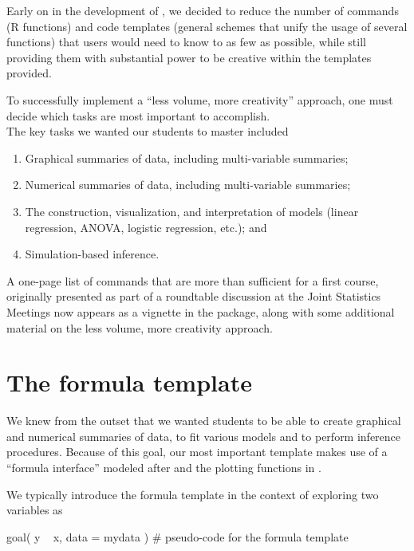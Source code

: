 Early on in the development of , we decided to reduce the
number of commands (R functions) and code templates (general schemes
that unify the usage of several functions) that users would need to know
to as few as possible, while still providing them with substantial power
to be creative within the templates provided.

To successfully implement a ``less volume, more creativity'' approach,
one must decide which tasks are most important to accomplish.\\
The key tasks we wanted our students to master included

\begin{enumerate}
\def\labelenumi{\arabic{enumi}.}
\tightlist
\item
  Graphical summaries of data, including multi-variable summaries;
\item
  Numerical summaries of data, including multi-variable summaries;
\item
  The construction, visualization, and interpretation of models (linear
  regression, ANOVA, logistic regression, etc.); and
\item
  Simulation-based inference.
\end{enumerate}

A one-page list of commands that are more than sufficient for a first
course, originally presented as part of a roundtable discussion at the
Joint Statistics Meetings \citep{Pruim:MinimalR:2011} now appears as a
vignette in the package, along with some additional material on the less
volume, more creativity approach.

\section{The formula template}\label{the-formula-template}

We knew from the outset that we wanted students to be able to create
graphical and numerical summaries of data, to fit various models and to
perform inference procedures. Because of this goal, our most important
template makes use of a ``formula interface'' modeled after 
and the plotting functions in  \citep{lattice}.

We typically introduce the formula template in the context of exploring
two variables as

\begin{Schunk}
\begin{Sinput}
goal( y ~ x, data = mydata )    # pseudo-code for the formula template
\end{Sinput}
\end{Schunk}

